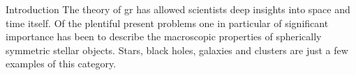 \begin{section}{Introduction}
The theory of \ac{gr} has allowed scientists deep insights into space and time itself.
Of the plentiful present problems one in particular of significant importance has been to describe the macroscopic properties of spherically symmetric stellar objects.
Stars, black holes, galaxies and clusters are just a few examples of this category.

\end{section}
